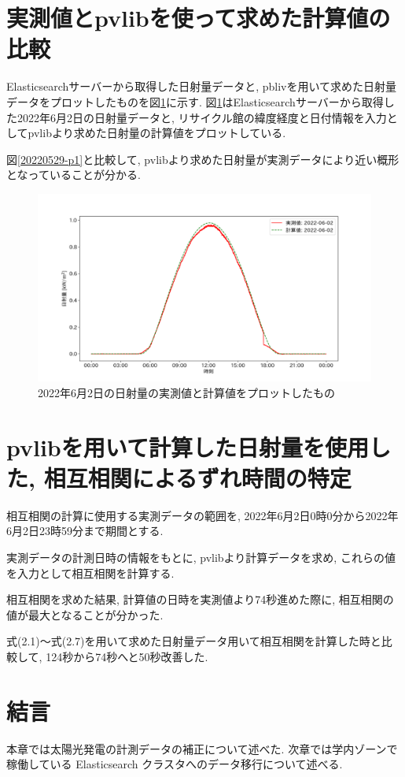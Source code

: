 \section{実測値とpvlibを使って求めた計算値の比較}
Elasticsearchサーバーから取得した日射量データと, pblivを用いて求めた日射量データをプロットしたものを図\ref{2-p1}に示す.
図\ref{2-p1}はElasticsearchサーバーから取得した2022年6月2日の日射量データと, リサイクル館の緯度経度と日付情報を入力としてpvlibより求めた日射量の計算値をプロットしている.

図\ref{20220529-p1}と比較して, pvlibより求めた日射量が実測データにより近い概形となっていることが分かる.

\begin{figure}[h]
  \begin{center}
    \includegraphics[width=160mm]{sotu/figure/2/pvlib-20220602-corr.png}
    \caption{2022年6月2日の日射量の実測値と計算値をプロットしたもの}
    \label{2-p1}
  \end{center}
\end{figure}

\section{pvlibを用いて計算した日射量を使用した, 相互相関によるずれ時間の特定}
相互相関の計算に使用する実測データの範囲を, 2022年6月2日0時0分から2022年6月2日23時59分まで期間とする.

実測データの計測日時の情報をもとに, pvlibより計算データを求め, これらの値を入力として相互相関を計算する.

相互相関を求めた結果, 計算値の日時を実測値より74秒進めた際に, 相互相関の値が最大となることが分かった.

式(2.1)～式(2.7)を用いて求めた日射量データ用いて相互相関を計算した時と比較して, 124秒から74秒へと50秒改善した.

\section{結言}
本章では太陽光発電の計測データの補正について述べた. 
次章では学内ゾーンで稼働している Elasticsearch クラスタへのデータ移行について述べる. 